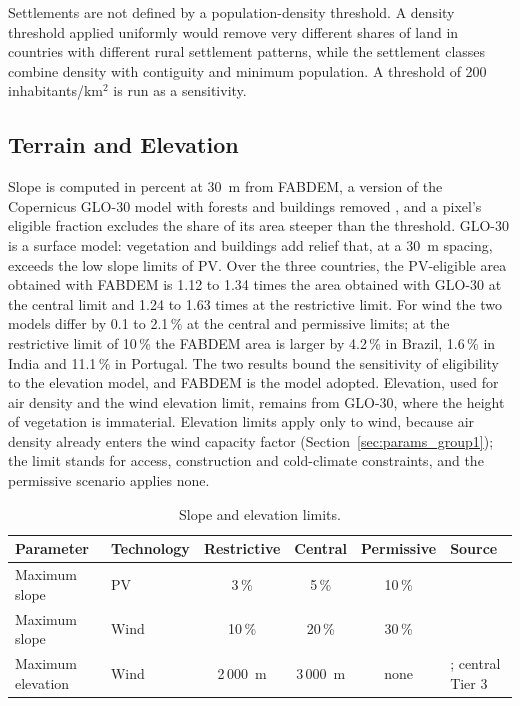 Settlements are not defined by a population-density threshold. A density
threshold applied uniformly would remove very different shares of land in
countries with different rural settlement patterns, while the settlement
classes combine density with contiguity and minimum population. A
threshold of 200 inhabitants/km$^2$ is run as a sensitivity.

\subsection{Terrain and Elevation}
\label{subsec:g6_terrain}

Slope is computed in percent at 30~m from FABDEM, a version of the
Copernicus GLO-30 model with forests and buildings removed
\cite{hawker2022fabdem}, and a pixel's eligible fraction excludes the
share of its area steeper than the threshold. GLO-30 is a surface model:
vegetation and buildings add relief that, at a 30~m spacing, exceeds the
low slope limits of PV. Over the three countries, the PV-eligible area
obtained with FABDEM is 1.12 to 1.34 times the area obtained with GLO-30
at the central limit and 1.24 to 1.63 times at the restrictive limit.
For wind the two models differ by 0.1 to 2.1\,\% at the central and
permissive limits; at the restrictive limit of 10\,\% the FABDEM area is
larger by 4.2\,\% in Brazil, 1.6\,\% in India and 11.1\,\% in Portugal.
The two results bound the sensitivity of eligibility to the elevation
model, and FABDEM is the model adopted. Elevation, used for air density and the wind
elevation limit, remains from GLO-30, where the height of vegetation is
immaterial. Elevation limits apply only to wind,
because air density already enters the wind capacity factor
(Section~\ref{sec:params_group1}); the limit stands for access,
construction and cold-climate constraints, and the permissive scenario
applies none.

\begin{table}[htbp]
    \centering
    \caption{Slope and elevation limits.}
    \label{tab:g6_terrain}
    \small
    \begin{tabular}{llcccl}
        \toprule
        Parameter & Technology & Restrictive & Central & Permissive & Source \\
        \midrule
        Maximum slope & PV   & 3\,\%  & 5\,\%  & 10\,\% & \cite{lopez2012,tao2024,blm2024westernsolar} \\
        Maximum slope & Wind & 10\,\% & 20\,\% & 30\,\% & \cite{vanhaaren2011,lopez2012,epg2024renewland} \\
        Maximum elevation & Wind & 2\,000~m & 3\,000~m & none & \cite{epg2024renewland}; central Tier 3 \\
        \bottomrule
    \end{tabular}
\end{table}

